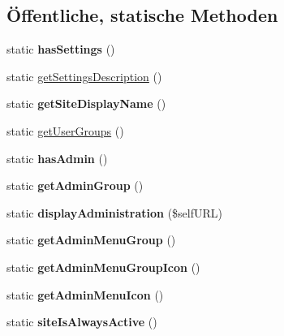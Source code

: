 \subsection*{Öffentliche, statische Methoden}
\begin{DoxyCompactItemize}
\item 
\mbox{\label{classdigital_signage_layout_powerpoints_a4665f0508a759a8c1294e27b5e4d800b}} 
static {\bfseries has\+Settings} ()
\item 
static \mbox{\hyperlink{classdigital_signage_layout_powerpoints_a0b9e5c7a160a90649ef49ad8e59e6694}{get\+Settings\+Description}} ()
\item 
\mbox{\label{classdigital_signage_layout_powerpoints_ae1bcf7f2adc71a4436bb6b79cc9b0998}} 
static {\bfseries get\+Site\+Display\+Name} ()
\item 
static \mbox{\hyperlink{classdigital_signage_layout_powerpoints_a992a47d5b7aa99ef722bb5dbbbee1673}{get\+User\+Groups}} ()
\item 
\mbox{\label{classdigital_signage_layout_powerpoints_a7ec9187aa0ada8432c55ca4fe2e0b909}} 
static {\bfseries has\+Admin} ()
\item 
\mbox{\label{classdigital_signage_layout_powerpoints_a7f47a18651d04eb2bc938a672c984ce5}} 
static {\bfseries get\+Admin\+Group} ()
\item 
\mbox{\label{classdigital_signage_layout_powerpoints_a0bdc81a164790ec65248bc8533793efd}} 
static {\bfseries display\+Administration} (\$self\+U\+RL)
\item 
\mbox{\label{classdigital_signage_layout_powerpoints_a9b17d20ed819d76638b860dfdaccef2b}} 
static {\bfseries get\+Admin\+Menu\+Group} ()
\item 
\mbox{\label{classdigital_signage_layout_powerpoints_a82fd2c2ddb8a987969c0a6269928e526}} 
static {\bfseries get\+Admin\+Menu\+Group\+Icon} ()
\item 
\mbox{\label{classdigital_signage_layout_powerpoints_af64b0aea65fa7285ab6cf4a29d094fe6}} 
static {\bfseries get\+Admin\+Menu\+Icon} ()
\item 
\mbox{\label{classdigital_signage_layout_powerpoints_a3701e4bbb3806f2a134e811174a827b0}} 
static {\bfseries site\+Is\+Always\+Active} ()
\end{DoxyCompactItemize}

